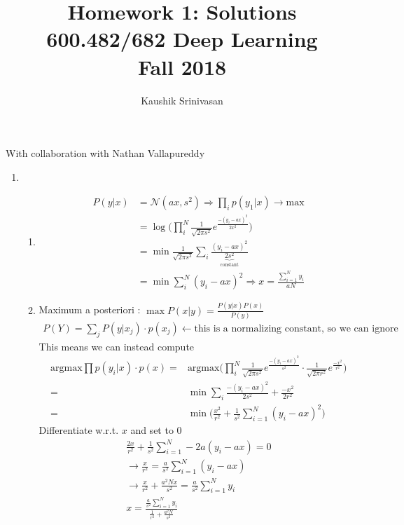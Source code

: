 \documentclass[a4paper]{article}
\title{Homework 1: Solutions\\
600.482/682 Deep Learning\\
Fall 2018}
\author{Kaushik Srinivasan}
\begin{document}
\maketitle
With collaboration with Nathan Vallapureddy

\vspace{5mm}
\begin{enumerate}
	\item 
	\begin{enumerate}
	\item 
	\begin{align*}
		P(y|x) & = \mathcal{N}(ax, s^2) \Rightarrow \prod_i p(y_1|x) \longrightarrow \text{max}\\
		& = \log \bigg(\prod_i^N \frac{1}{\sqrt{2\pi s^2}} e^{\frac{-(y_i - ax)^2}{2x^2}} \bigg)\\
		& = \min \frac{1}{\sqrt{2\pi s^2}} \sum_i \frac{(y_i - ax)^2}{\underbrace{2s^2}_{\text{constant}}}\\
		& = \boxed{\min \sum_i^N (y_i - ax)^2} \Longrightarrow x = \frac{\sum_{i=1}^N y_i}{aN}
	\end{align*}
	\item Maximum a posteriori : $\max P(x|y) = \frac{P(y|x) P(x)}{P(y)}$
	\begin{gather*}
		P(Y) = \sum_j P(y|x_j) \cdot p(x_j) \leftarrow \text{this is a normalizing constant, so we can ignore}
	\end{gather*}
	This means we can instead compute
	\begin{align*}
		\text{argmax} \prod p(y_i|x) \cdot p(x) = & \text{argmax} \bigg(\prod_i^N \frac{1}{\sqrt{2\pi s^2}} e^{\frac{-(y_i - ax)^2}{s^2}} \cdot \frac{1}{\sqrt{2\pi r^2}} e^{\frac{-x^2}{r^2}}\bigg)\\
		= & \min \sum_i \frac{-(y_i - ax)^2}{2s^2} + \frac{-x^2}{2r^2}\\
		= & \min\bigg( \frac{x^2}{r^2} + \frac{1}{s^2} \sum_{i=1}^N (y_i - ax)^2 \bigg)
	\end{align*}
	Differentiate w.r.t. $x$ and set to 0 
	\begin{gather*}
		\frac{2x}{r^2} + \frac{1}{s^2} \sum_{i=1}^N -2a(y_i - ax) = 0\\
		\rightarrow \frac{x}{r^2} = \frac{a}{s^2}\sum_{i=1}^N (y_i - ax)\\
		\rightarrow \frac{x}{r^2} + \frac{a^2Nx}{s^2} = \frac{a}{s^2} \sum_{i=1}^N y_i\\
		\boxed{x = \frac{\frac{a}{s^2} \sum_{i=1}^N y_i}{\frac{1}{r^2} + \frac{a^2N}{s^2}}}
	\end{gather*}

\end{enumerate}
\end{enumerate}
\end{document}
